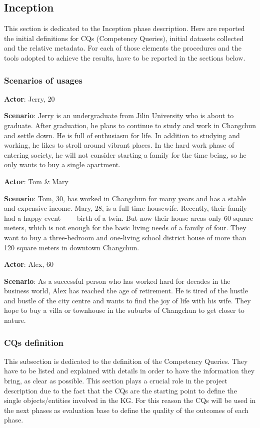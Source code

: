 \subsection{Inception}
This section is dedicated to the Inception phase description. Here are reported the initial definitions for CQs (Competency Queries), initial datasets collected and the relative metadata. For each of those elements the procedures
and the tools adopted to achieve the results, have to be reported in the sections below.

\subsubsection{Scenarios of usages}

\item
\textbf{Actor}: Jerry, 20
\item
\textbf{Scenario}: Jerry is an undergraduate from Jilin University who is about to graduate. After graduation, he plans to continue to study and work in Changchun and settle down. He is full of enthusiasm for life. In addition to studying and working, he likes to stroll around vibrant places. In the hard work phase of entering society, he will not consider starting a family for the time being, so he only wants to buy a single apartment.


\item
\textbf{Actor}: Tom & Mary
\item
\textbf{Scenario}: Tom, 30, has worked in Changchun for many years and has a stable and expensive income. Mary, 28, is a full-time housewife. Recently, their family had a happy event ——birth of a twin. But now their house areas only 60 square meters, which is not enough for the basic living needs of a family of four. They want to buy a three-bedroom and one-living school district house of more than 120 square meters in downtown Changchun.


\item
\textbf{Actor}: Alex, 60
\item
\textbf{Scenario}: As a successful person who has worked hard for decades in the business world, Alex has reached the age of retirement. He is tired of the hustle and bustle of the city centre and wants to find the joy of life with his wife. They hope to buy a villa or townhouse in the suburbs of Changchun to get closer to nature.

\subsubsection{CQs definition}
This subsection is dedicated to the definition of the Competency Queries. They have to be listed and explained with details in order to have the information they bring, as clear as possible. This section plays a crucial role in the project description due to the fact that the CQs are the starting point to define the single objects/entities involved in the KG. For this reason the CQs will be used in the next phases as evaluation base to define the quality of the outcomes of each phase. 


